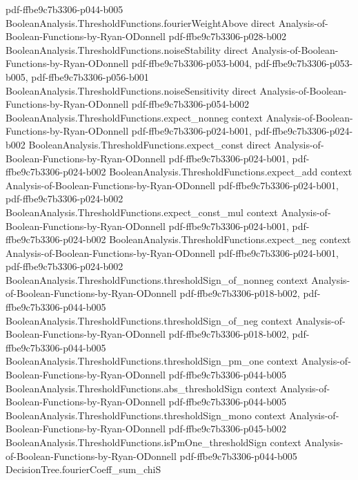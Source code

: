 \begin{lemma}
  {pdf-ffbe9c7b3306-p044-b005}
\proofstep
  {BooleanAnalysis.ThresholdFunctions.fourierWeightAbove}
  {direct}
  {Analysis-of-Boolean-Functions-by-Ryan-ODonnell}
  {pdf-ffbe9c7b3306-p028-b002}
\proofstep
  {BooleanAnalysis.ThresholdFunctions.noiseStability}
  {direct}
  {Analysis-of-Boolean-Functions-by-Ryan-ODonnell}
  {pdf-ffbe9c7b3306-p053-b004,
    pdf-ffbe9c7b3306-p053-b005,
    pdf-ffbe9c7b3306-p056-b001}
\proofstep
  {BooleanAnalysis.ThresholdFunctions.noiseSensitivity}
  {direct}
  {Analysis-of-Boolean-Functions-by-Ryan-ODonnell}
  {pdf-ffbe9c7b3306-p054-b002}
\proofstep
  {BooleanAnalysis.ThresholdFunctions.expect_nonneg}
  {context}
  {Analysis-of-Boolean-Functions-by-Ryan-ODonnell}
  {pdf-ffbe9c7b3306-p024-b001,
    pdf-ffbe9c7b3306-p024-b002}
\proofstep
  {BooleanAnalysis.ThresholdFunctions.expect_const}
  {direct}
  {Analysis-of-Boolean-Functions-by-Ryan-ODonnell}
  {pdf-ffbe9c7b3306-p024-b001,
    pdf-ffbe9c7b3306-p024-b002}
\proofstep
  {BooleanAnalysis.ThresholdFunctions.expect_add}
  {context}
  {Analysis-of-Boolean-Functions-by-Ryan-ODonnell}
  {pdf-ffbe9c7b3306-p024-b001,
    pdf-ffbe9c7b3306-p024-b002}
\proofstep
  {BooleanAnalysis.ThresholdFunctions.expect_const_mul}
  {context}
  {Analysis-of-Boolean-Functions-by-Ryan-ODonnell}
  {pdf-ffbe9c7b3306-p024-b001,
    pdf-ffbe9c7b3306-p024-b002}
\proofstep
  {BooleanAnalysis.ThresholdFunctions.expect_neg}
  {context}
  {Analysis-of-Boolean-Functions-by-Ryan-ODonnell}
  {pdf-ffbe9c7b3306-p024-b001,
    pdf-ffbe9c7b3306-p024-b002}
\proofstep
  {BooleanAnalysis.ThresholdFunctions.thresholdSign_of_nonneg}
  {context}
  {Analysis-of-Boolean-Functions-by-Ryan-ODonnell}
  {pdf-ffbe9c7b3306-p018-b002,
    pdf-ffbe9c7b3306-p044-b005}
\proofstep
  {BooleanAnalysis.ThresholdFunctions.thresholdSign_of_neg}
  {context}
  {Analysis-of-Boolean-Functions-by-Ryan-ODonnell}
  {pdf-ffbe9c7b3306-p018-b002,
    pdf-ffbe9c7b3306-p044-b005}
\proofstep
  {BooleanAnalysis.ThresholdFunctions.thresholdSign_pm_one}
  {context}
  {Analysis-of-Boolean-Functions-by-Ryan-ODonnell}
  {pdf-ffbe9c7b3306-p044-b005}
\proofstep
  {BooleanAnalysis.ThresholdFunctions.abs_thresholdSign}
  {context}
  {Analysis-of-Boolean-Functions-by-Ryan-ODonnell}
  {pdf-ffbe9c7b3306-p044-b005}
\proofstep
  {BooleanAnalysis.ThresholdFunctions.thresholdSign_mono}
  {context}
  {Analysis-of-Boolean-Functions-by-Ryan-ODonnell}
  {pdf-ffbe9c7b3306-p045-b002}
\proofstep
  {BooleanAnalysis.ThresholdFunctions.isPmOne_thresholdSign}
  {context}
  {Analysis-of-Boolean-Functions-by-Ryan-ODonnell}
  {pdf-ffbe9c7b3306-p044-b005}
\proofstep
  {DecisionTree.fourierCoeff_sum_chiS}

\end{lemma}
